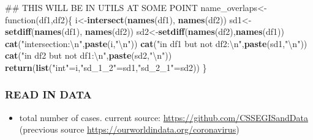 \documentclass[]{article}
\newenvironment{Shaded}{\begin{snugshade}}{\end{snugshade}}
\newcommand{\KeywordTok}[1]{\textcolor[rgb]{0.13,0.29,0.53}{\textbf{{#1}}}}
\newcommand{\CharTok}[1]{\textcolor[rgb]{0.31,0.60,0.02}{{#1}}}
\newcommand{\StringTok}[1]{\textcolor[rgb]{0.31,0.60,0.02}{{#1}}}
\newcommand{\NormalTok}[1]{{#1}}
\providecommand{\tightlist}{%
  \setlength{\itemsep}{0pt}\setlength{\parskip}{0pt}}
\begin{document}
\begin{Shaded}
\begin{Highlighting}[]
\NormalTok{## THIS WILL BE IN UTILS AT SOME POINT}
\NormalTok{name_overlaps<-function(df1,df2)\{}
\NormalTok{i<-}\KeywordTok{intersect}\NormalTok{(}\KeywordTok{names}\NormalTok{(df1),}
\KeywordTok{names}\NormalTok{(df2))}
\NormalTok{sd1<-}\KeywordTok{setdiff}\NormalTok{(}\KeywordTok{names}\NormalTok{(df1),}
\KeywordTok{names}\NormalTok{(df2))}
\NormalTok{sd2<-}\KeywordTok{setdiff}\NormalTok{(}\KeywordTok{names}\NormalTok{(df2),}\KeywordTok{names}\NormalTok{(df1))}
\KeywordTok{cat}\NormalTok{(}\StringTok{"intersection:}\CharTok{\textbackslash{}n}\StringTok{"}\NormalTok{,}\KeywordTok{paste}\NormalTok{(i,}\StringTok{"}\CharTok{\textbackslash{}n}\StringTok{"}\NormalTok{))}
\KeywordTok{cat}\NormalTok{(}\StringTok{"in df1 but not df2:}\CharTok{\textbackslash{}n}\StringTok{"}\NormalTok{,}\KeywordTok{paste}\NormalTok{(sd1,}\StringTok{"}\CharTok{\textbackslash{}n}\StringTok{"}\NormalTok{))}
\KeywordTok{cat}\NormalTok{(}\StringTok{"in df2 but not df1:}\CharTok{\textbackslash{}n}\StringTok{"}\NormalTok{,}\KeywordTok{paste}\NormalTok{(sd2,}\StringTok{"}\CharTok{\textbackslash{}n}\StringTok{"}\NormalTok{))}
\KeywordTok{return}\NormalTok{(}\KeywordTok{list}\NormalTok{(}\StringTok{"int"}\NormalTok{=i,}\StringTok{"sd_1_2"}\NormalTok{=sd1,}\StringTok{"sd_2_1"}\NormalTok{=sd2))}
\NormalTok{\}}
\end{Highlighting}
\end{Shaded}

\subsubsection{READ IN DATA}\label{read-in-data}

\begin{itemize}
\tightlist
\item
  total number of cases. current source:
  \url{https://github.com/CSSEGISandData} (precvious source
  \url{https://ourworldindata.org/coronavirus})
\end{itemize}
\end{document}
